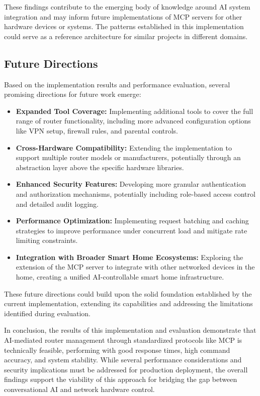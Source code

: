 These findings contribute to the emerging body of knowledge around AI system integration and may inform future implementations of MCP servers for other hardware devices or systems. The patterns established in this implementation could serve as a reference architecture for similar projects in different domains.

\subsection{Future Directions}
Based on the implementation results and performance evaluation, several promising directions for future work emerge:

\begin{itemize}
\item \textbf{Expanded Tool Coverage:} Implementing additional tools to cover the full range of router functionality, including more advanced configuration options like VPN setup, firewall rules, and parental controls.
\item \textbf{Cross-Hardware Compatibility:} Extending the implementation to support multiple router models or manufacturers, potentially through an abstraction layer above the specific hardware libraries.
\item \textbf{Enhanced Security Features:} Developing more granular authentication and authorization mechanisms, potentially including role-based access control and detailed audit logging.
\item \textbf{Performance Optimization:} Implementing request batching and caching strategies to improve performance under concurrent load and mitigate rate limiting constraints.
\item \textbf{Integration with Broader Smart Home Ecosystems:} Exploring the extension of the MCP server to integrate with other networked devices in the home, creating a unified AI-controllable smart home infrastructure.
\end{itemize}

These future directions could build upon the solid foundation established by the current implementation, extending its capabilities and addressing the limitations identified during evaluation.

In conclusion, the results of this implementation and evaluation demonstrate that AI-mediated router management through standardized protocols like MCP is technically feasible, performing with good response times, high command accuracy, and system stability. While several performance considerations and security implications must be addressed for production deployment, the overall findings support the viability of this approach for bridging the gap between conversational AI and network hardware control.
